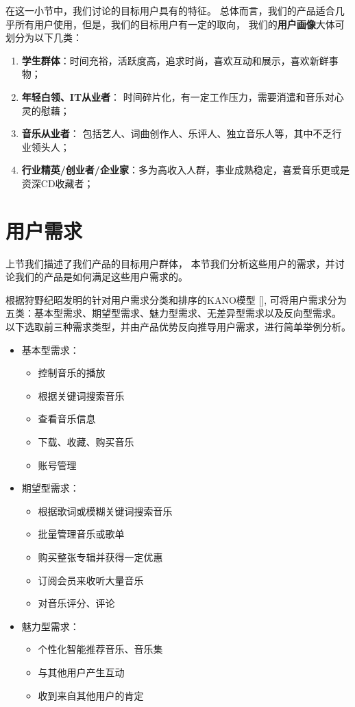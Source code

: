 在这一小节中，我们讨论\proname 的目标用户具有的特征。
总体而言，我们的产品适合几乎所有用户使用，但是，我们的目标用户有一定的取向，
我们的\textbf{用户画像}大体可划分为以下几类：
\begin{enumerate}
    \item \textbf{学生群体}：时间充裕，活跃度高，追求时尚，喜欢互动和展示，喜欢新鲜事物；
    \item \textbf{年轻白领、IT从业者}：
    时间碎片化，有一定工作压力，需要消遣和音乐对心灵的慰藉；
    \item \textbf{音乐从业者}：
    包括艺人、词曲创作人、乐评人、独立音乐人等，其中不乏行业领头人；
    \item \textbf{行业精英/创业者/企业家}：多为高收入人群，事业成熟稳定，喜爱音乐更或是资深CD收藏者；
\end{enumerate}

\section{用户需求} %

上节我们描述了我们产品的目标用户群体， 
    本节我们分析这些用户的需求，并讨论我们的产品是如何满足这些用户需求的。

根据狩野纪昭发明的针对用户需求分类和排序的KANO模型
    [\cite{gunther2000quality}], 
    可将用户需求分为五类：基本型需求、期望型需求、魅力型需求、无差异型需求以及反向型需求。
    以下选取前三种需求类型，并由产品优势反向推导用户需求，进行简单举例分析。

\begin{itemize}
    \item 基本型需求：
    \begin{itemize}
        \item 控制音乐的播放
        \item 根据关键词搜索音乐
        \item 查看音乐信息
        \item 下载、收藏、购买音乐
        \item 账号管理
    \end{itemize}
    \item 期望型需求：
    \begin{itemize}
        \item 根据歌词或模糊关键词搜索音乐
        \item 批量管理音乐或歌单
        \item 购买整张专辑并获得一定优惠
        \item 订阅会员来收听大量音乐
        \item 对音乐评分、评论
    \end{itemize}
    \item 魅力型需求：
    \begin{itemize}
        \item 个性化智能推荐音乐、音乐集
        \item 与其他用户产生互动
        \item 收到来自其他用户的肯定
    \end{itemize}
\end{itemize}

